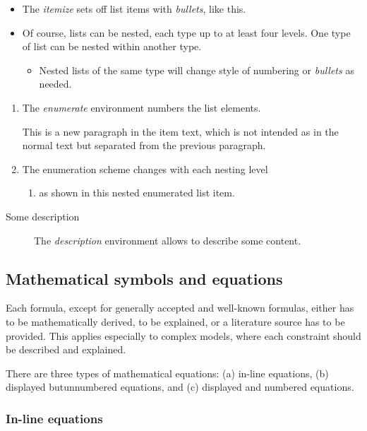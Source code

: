 \begin{itemize}
\item 
The \emph{itemize} sets off list items with \emph{bullets}, like this.
%
\item Of course, lists can be nested, each type up to at least four levels.
One type of list can be nested within another type.
%
  \begin{itemize}
  \item Nested lists of the same type will change style of numbering 
  or \emph{bullets} as needed.
  \end{itemize}
\end{itemize}
%
\begin{enumerate}
\item The \emph{enumerate} environment numbers the list elements.

This is a new paragraph in the item text, which is not intended as in the normal text but separated from the previous paragraph.
%
\item The enumeration scheme changes with each nesting level
  \begin{enumerate}
  \item as shown in this nested enumerated list item.
  \end{enumerate}
\end{enumerate} 

\begin{description}
\item[Some description] The \emph{description} environment allows to describe some content.
\end{description}

\subsection{Mathematical symbols and equations}
\label{sec:math}

Each formula, except for generally accepted and well-known formulas, either has to be mathematically derived, to be explained, or a literature source has to be provided. This applies especially to complex models, where each constraint should be described and explained.

There are three types of mathematical equations: (a) in-line equations, (b) displayed butunnumbered equations, and (c) displayed and numbered equations.

\subsubsection{In-line equations}
\label{sec:inlineeq}

